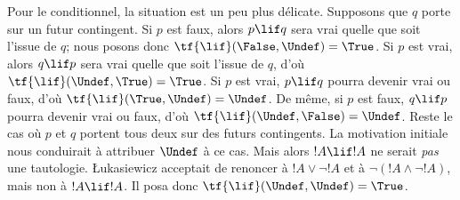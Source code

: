 \documentclass[../../../include/open-logic-section]{subfiles}
\begin{document}
Pour le conditionnel, la situation
est un peu plus délicate. Supposons
que $q$ porte sur un futur contingent.
Si $p$ est faux, alors $p\lif q$
sera vrai quelle que soit l'issue
de $q$; nous posons donc
$\tf{\lif}(\False,\Undef)=\True$.
Si $p$ est vrai, alors $q\lif p$
sera vrai quelle que soit l'issue
de $q$, d'où
$\tf{\lif}(\Undef,\True)=\True$.
Si $p$ est vrai, $p\lif q$ pourra
devenir vrai ou faux, d'où
$\tf{\lif}(\True,\Undef)=\Undef$.
De même, si $p$ est faux, $q\lif p$
pourra devenir vrai ou faux, d'où
$\tf{\lif}(\Undef,\False)=\Undef$.
Reste le cas où $p$ et $q$ portent
tous deux sur des futurs contingents.
La motivation initiale nous conduirait
à attribuer $\Undef$ à ce cas. Mais
alors $!A\lif !A$ ne serait \emph{pas}
une tautologie. \L ukasiewicz acceptait
de renoncer à $!A\lor\lnot !A$ et à
$\lnot(!A\land\lnot !A)$, mais non
à $!A\lif !A$. Il posa donc
$\tf{\lif}(\Undef,\Undef)=\True$.
\end{document}
